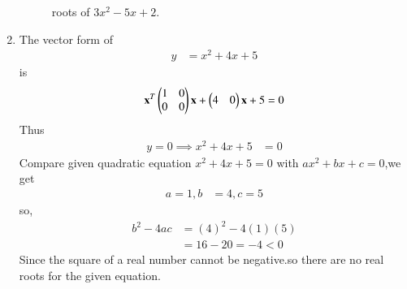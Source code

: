 \documentclass[journal,12pt,twocolumn]{IEEEtran}
\begin{document}
\begin{enumerate}
\begin{figure}[ht!]
    \caption{roots of $3x^2-5x+2$.}
    \label{fig:Roots Of $3x^2-5x+2 &=$.}
\end{figure} 
\item
The vector form of
\begin{align}
y&=x^2+4x+5
\end{align}
is
\begin{align}
\mathbf{x}^T \begin{pmatrix}1 & 0\\0 & 0\end{pmatrix}\mathbf{x}+ \begin{pmatrix}4 & 0\end{pmatrix}\mathbf{x}+5=0
\end{align}
Thus
\begin{align}
y=0\implies x^2+4x+5 &=0
\end{align}
%
Compare given quadratic equation  $x ^2 +4x +5 = 0$ with $ax^2 + bx + c = 0$,we get
\begin{align}
a=1,b&=4,c=5
\end{align}
so,
\begin{align}
b^2-4ac&=(4)^2-4(1)(5)\\
&=16-20=-4<0
\end{align}
Since the square of a real number cannot be negative.so there are no real roots for the given equation.
\end{enumerate}
\end{document}
